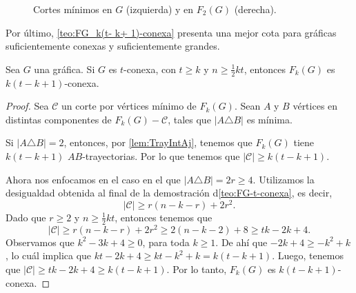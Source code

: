 \begin{figure}[ht!]
    \caption{Cortes m\'inimos en $G$ (izquierda) y en $F_2(G)$ (derecha).}
    \label{fig:ex-tConect}
    \end{figure}

Por \'ultimo, \cref{teo:FG_k(t- k+ 1)-conexa} presenta una mejor cota para
gr\'aficas suficientemente conexas y suficientemente grandes.

\begin{teorema}%
    \label{teo:FG_k(t- k+ 1)-conexa}
        Sea $G$ una gr\'afica. Si $G$ es $t$-conexa, con $t \ge k$ y $n \ge
        \frac{1}{2} kt$, entonces $F_{k}(G)$ es $k (t- k+ 1)$-conexa.
    \end{teorema}

    \begin{proof}
        Sea $\mathcal{C}$ un corte por v\'ertices m\'inimo de $F_k(G)$. Sean $A$
        y $B$ v\'ertices en distintas componentes de $F_k(G)- \mathcal{C}$,
        tales que $|A \triangle B|$ es m\'inima.

        Si $|A \triangle B| = 2$, entonces, por \cref{lem:TrayIntAj}, tenemos
        que $F_k(G)$ tiene $k (t- k+ 1)$ $AB$-trayectorias. Por lo que tenemos
        que $|\mathcal{C}| \geq k (t- k+ 1)$.

        Ahora nos enfocamos en el caso en el que $|A \triangle B| = 2r \ge 4$.
        Utilizamos la desigualdad obtenida al final de la demostraci\'on
        d\cref{teo:FG-t-conexa}, es decir, 
        \[
            |\mathcal{C}| \ge r(n-k-r)+2r^2.
        \]
        Dado que $r \ge 2$ y $n \ge \frac{1}{2}kt$, entonces tenemos que 
        \[
            |\mathcal{C}| \ge r(n-k-r)+2r^2 \ge 2 (n- k -2) + 8 \ge tk - 2k+ 4.
        \]
        Observamos que $k^2 -3k + 4 \ge 0$, para toda $k \ge 1$. De ah\'i que
        $-2k+4 \ge -k^2 + k$, lo cu\'al implica que $kt -2k +4 \ge kt - k^2 + k
        = k (t - k +1)$. Luego, tenemos que $|\mathcal{C}| \ge tk -2k +4 \ge
        k(t-k+1)$. Por lo tanto, $F_k(G)$ es $k(t-k+1)$-conexa.
    \end{proof}